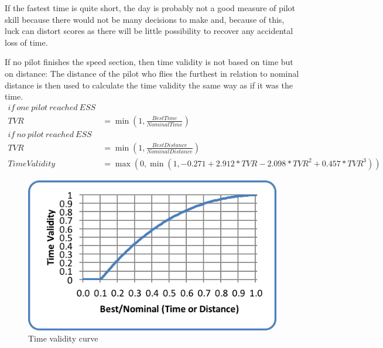 \documentclass{article}
\begin{document}
If the fastest time is quite short, the day is probably not a good measure of
pilot skill because there would not be many decisions to make and, because of
this, luck can distort scores as there will be little possibility to recover
any accidental loss of time.

If no pilot finishes the speed section, then time validity is not based on time
but on distance: The distance of the pilot who flies the furthest in relation
to nominal distance is then used to calculate the time validity the same way as
if it was the time.
\begin{align*}
    if \ one \ pilot \ reached \ ESS \\
    TVR &= \min(1, \frac{BestTime}{NominalTime}) \\
    if \ no \ pilot \ reached \ ESS \\
    TVR &= \min(1, \frac{BestDistance}{NominalDistance}) \\
    TimeValidity &= \max(0, \min(1, -0.271 + 2.912 * TVR - 2.098 * TVR^2 + 0.457 * TVR^3))
\end{align*}

\begin{figure}[h!]
    \centering
    \includegraphics{img/time-validity.png}
    \caption{Time validity curve}
\end{figure}

\newpage
\end{document}
